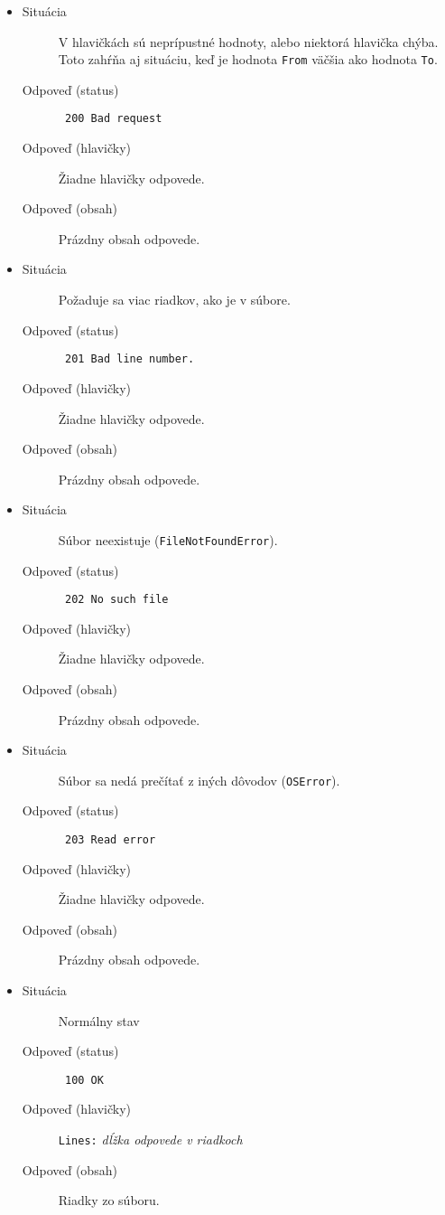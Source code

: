 \begin{itemize}
\item
\begin{description}
\item[Situácia]
V hlavičkách sú neprípustné hodnoty, alebo niektorá hlavička chýba. Toto zahŕňa aj situáciu, keď je hodnota \texttt{From} väčšia ako hodnota \texttt{To}.
\item[Odpoveď (status)]
\texttt{ 200 Bad request }
\item[Odpoveď (hlavičky)]
Žiadne hlavičky odpovede.
\item[Odpoveď (obsah)]
Prázdny obsah odpovede.
\end{description}
\item
\begin{description}
\item[Situácia]
Požaduje sa viac riadkov, ako je v súbore.
\item[Odpoveď (status)]
\texttt{ 201 Bad line number. }
\item[Odpoveď (hlavičky)]
Žiadne hlavičky odpovede.
\item[Odpoveď (obsah)]
Prázdny obsah odpovede.
\end{description}
\item
\begin{description}
\item[Situácia]
Súbor neexistuje (\texttt{FileNotFoundError}).
\item[Odpoveď (status)]
\texttt{ 202 No such file }
\item[Odpoveď (hlavičky)]
Žiadne hlavičky odpovede.
\item[Odpoveď (obsah)]
Prázdny obsah odpovede.
\end{description}
\item
\begin{description}
\item[Situácia]
Súbor sa nedá prečítať z iných dôvodov (\texttt{OSError}).
\item[Odpoveď (status)]
\texttt{ 203 Read error }
\item[Odpoveď (hlavičky)]
Žiadne hlavičky odpovede.
\item[Odpoveď (obsah)]
Prázdny obsah odpovede.
\end{description}
\item
\begin{description}
\item[Situácia]
Normálny stav
\item[Odpoveď (status)]
\texttt{ 100 OK }
\item[Odpoveď (hlavičky)]
\texttt{Lines:} \emph{dĺžka odpovede v riadkoch}
\item[Odpoveď (obsah)]
Riadky zo súboru.
\end{description}
\end{itemize}
